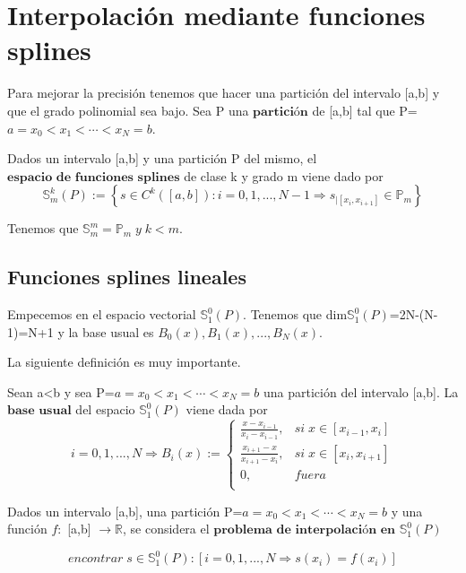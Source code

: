 \section{Interpolación mediante funciones splines}
Para mejorar la precisión tenemos que hacer una partición del intervalo [a,b] y que el grado polinomial sea bajo. Sea P una $\textbf{partición}$ de [a,b] tal que P={$a=x_0 < x_1 < \cdots < x_N = b$}.

\begin{ndef}
Dados un intervalo [a,b] y una partición P del mismo, el $\textbf{espacio de funciones splines}$ de clase k y grado m viene dado por
\[ \mathbb{S}_m^k(P) := \left\lbrace s \in C^k ( \left[ a,b \right] ) : i=0,1,...,N-1 \Rightarrow s_{\vert \left[ x_i, x_{i+1} \right]} \in \mathbb{P} _m \right\rbrace \]
\end{ndef}

Tenemos que $\mathbb{S}_m^m = \mathbb{P}_m \; y \; k<m$.

\subsection{Funciones splines lineales}
Empecemos en el espacio vectorial $\mathbb{S}_1^0(P)$. Tenemos que dim$\mathbb{S}_1^0(P)$=2N-(N-1)=N+1 y la base usual es {$B_0(x),B_1(x),...,B_N(x)$}.

La siguiente definición es muy importante.

\begin{ndef}
Sean a<b y sea P={$a=x_0<x_1<\cdots < x_N=b$} una partición del intervalo [a,b]. La $\textbf{base usual}$ del espacio $\mathbb{S}_1^0(P)$ viene dada por
\[ i=0,1,...,N \Rightarrow B_i(x) := \left\lbrace
\begin{array}{ll}
\frac{x-x_{i-1}}{x_i-x_{i-1}}, & si \; x \in \left[ x_{i-1},x_i \right] \\
\frac{x_{i+1}-x}{x_{i+1}-x_i}, & si \; x \in \left[ x_i,x_{i+1} \right] \\
0, & fuera \\
\end{array}
\right.
\]
\end{ndef}

Dados un intervalo [a,b], una partición P={$a=x_0<x_1<\cdots < x_N=b$} y una función $f:$ [a,b] $\longrightarrow \mathbb{R}$, se considera el $\textbf{problema de interpolación en}$ $\mathbb{S}_1^0(P)$

\[encontrar \; s \in \mathbb{S}_1^0(P) : \left[ i=0,1,...,N \Rightarrow s(x_i) = f(x_i) \right] \]

